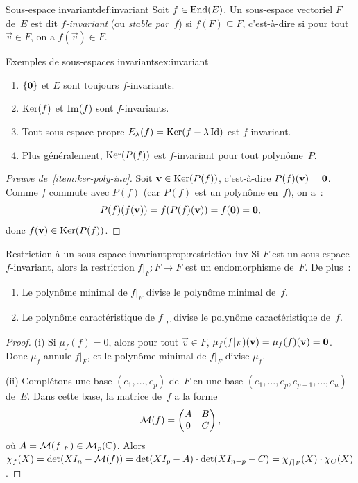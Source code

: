 \begin{definition}{Sous-espace invariant}{def:invariant}
  Soit $f\in\operatorname{End}(E)$. Un sous-espace vectoriel $F$ de~$E$ est dit
  \emph{$f$-invariant} (ou \emph{stable
  par~$f$}) si $f(F)\subseteq F$, c'est-à-dire si pour tout
  $\vec{v}\in F$, on a $f(\vec{v})\in F$.
\end{definition}

\begin{example}{Exemples de sous-espaces invariants}{ex:invariant}
  \begin{enumerate}[label=(\roman*)]
    \item $\left\{\mathbf{0}\right\}$ et $E$ sont toujours $f$-invariants.
    \item $\operatorname{Ker}(f)$ et $\operatorname{Im}(f)$ sont $f$-invariants.
    \item Tout sous-espace propre $E_\lambda(f)=\operatorname{Ker}(f-\lambda\operatorname{Id})$ est
      $f$-invariant.
    \item Plus généralement, $\operatorname{Ker}(P(f))$ est $f$-invariant pour tout
      polynôme~$P$.\label{item:ker-poly-inv}
  \end{enumerate}
\end{example}

\begin{proof}[Preuve de~\ref{item:ker-poly-inv}]
  Soit $\mathbf{v}\in\operatorname{Ker}(P(f))$, c'est-à-dire $P(f)(\mathbf{v})=\mathbf{0}$. Comme
  $f$ commute avec $P(f)$ (car $P(f)$ est un polynôme en~$f$), on a~:
  \[
    P(f)(f(\mathbf{v}))=f(P(f)(\mathbf{v}))=f(\mathbf{0})=\mathbf{0},
  \]
  donc $f(\mathbf{v})\in\operatorname{Ker}(P(f))$.
\end{proof}

\begin{proposition}{Restriction à un sous-espace invariant}{prop:restriction-inv}
  Si $F$ est un sous-espace $f$-invariant, alors la restriction
  $f|_F\colon F\to F$ est un endomorphisme de~$F$. De plus~:
  \begin{enumerate}[label=(\roman*)]
    \item Le polynôme minimal de $f|_F$ divise le polynôme minimal
      de~$f$.
    \item Le polynôme caractéristique de $f|_F$ divise le polynôme
      caractéristique de~$f$.
  \end{enumerate}
\end{proposition}

\begin{proof}
  (i) Si $\mu_f(f)=0$, alors pour tout $\vec{v}\in F$,
  $\mu_f(f|_F)(\mathbf{v})=\mu_f(f)(\mathbf{v})=\mathbf{0}$. Donc $\mu_f$
  annule $f|_F$, et le polynôme minimal de $f|_F$ divise $\mu_f$.

  (ii) Complétons une base $(e_1,\ldots,e_p)$ de~$F$ en une base
  $(e_1,\ldots,e_p,e_{p+1},\ldots,e_n)$ de~$E$. Dans cette base, la
  matrice de~$f$ a la forme
  \[
    \mathcal{M}(f)=\begin{pmatrix}A&B\\0&C\end{pmatrix},
  \]
  où $A=\mathcal{M}(f|_F)\in\mathcal{M}_p({\mathbb{C}})$. Alors
  $\chi_f(X)=\det(XI_n-\mathcal{M}(f))=\det(XI_p-A)\cdot\det(XI_{n-p}-C)
  =\chi_{f|_F}(X)\cdot\chi_C(X)$.
\end{proof}


